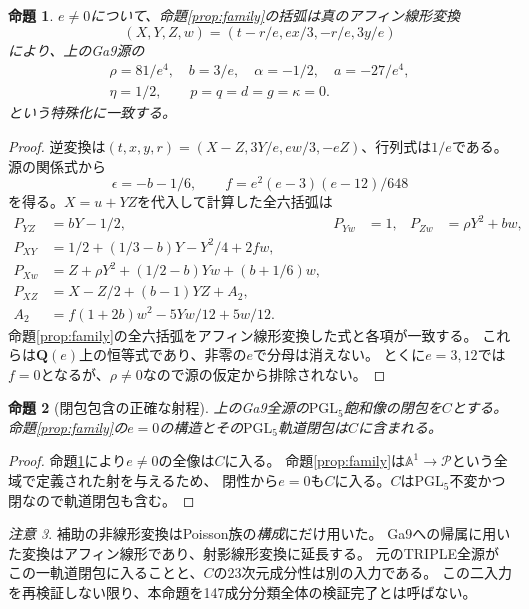 \documentclass[a4paper,11pt]{ltjsarticle}
\newtheorem{proposition}{命題}[section]
\theoremstyle{remark}\newtheorem{remark}[proposition]{注意}
\newcommand{\Q}{\mathbf Q}
\begin{document}
\begin{proposition}\label{prop:ga9}
$e\ne0$について、命題\ref{prop:family}の括弧は真のアフィン線形変換
\[
 (X,Y,Z,w)=(t-r/e,ex/3,-r/e,3y/e)
\]
により、上のGa9源の
\[
\begin{gathered}
 \rho=81/e^4,\quad b=3/e,\quad\alpha=-1/2,\quad a=-27/e^4,\\
 \eta=1/2,\qquad p=q=d=g=\kappa=0.
\end{gathered}
\]
という特殊化に一致する。
\end{proposition}
\begin{proof}
逆変換は$(t,x,y,r)=(X-Z,3Y/e,ew/3,-eZ)$、行列式は$1/e$である。
源の関係式から
\[
 \epsilon=-b-1/6,\qquad f=e^2(e-3)(e-12)/648
\]
を得る。$X=u+YZ$を代入して計算した全六括弧は
\begin{align*}
 P_{YZ}&=bY-1/2,&P_{Yw}&=1,&P_{Zw}&=\rho Y^2+bw,\\
 P_{XY}&=1/2+(1/3-b)Y-Y^2/4+2fw,\\
 P_{Xw}&=Z+\rho Y^2+(1/2-b)Yw+(b+1/6)w,\\
 P_{XZ}&=X-Z/2+(b-1)YZ+A_2,\\
 A_2&=f(1+2b)w^2-5Yw/12+5w/12.
\end{align*}
命題\ref{prop:family}の全六括弧をアフィン線形変換した式と各項が一致する。
これらは$\Q(e)$上の恒等式であり、非零の$e$で分母は消えない。
とくに$e=3,12$では$f=0$となるが、$\rho\ne0$なので源の仮定から排除されない。
\end{proof}

\begin{proposition}[閉包包含の正確な射程]\label{prop:closure}
上のGa9全源の$\mathrm{PGL}_5$飽和像の閉包を$C$とする。
命題\ref{prop:family}の$e=0$の構造とその$\mathrm{PGL}_5$軌道閉包は$C$に含まれる。
\end{proposition}
\begin{proof}
命題\ref{prop:ga9}により$e\ne0$の全像は$C$に入る。
命題\ref{prop:family}は$\mathbb A^1\to\mathcal P$という全域で定義された射を与えるため、
閉性から$e=0$も$C$に入る。$C$は$\mathrm{PGL}_5$不変かつ閉なので軌道閉包も含む。
\end{proof}
\begin{remark}
補助の非線形変換はPoisson族の\emph{構成}にだけ用いた。
Ga9への帰属に用いた変換はアフィン線形であり、射影線形変換に延長する。
元のTRIPLE全源がこの一軌道閉包に入ることと、$C$の23次元成分性は別の入力である。
この二入力を再検証しない限り、本命題を147成分分類全体の検証完了とは呼ばない。
\end{remark}
\end{document}
